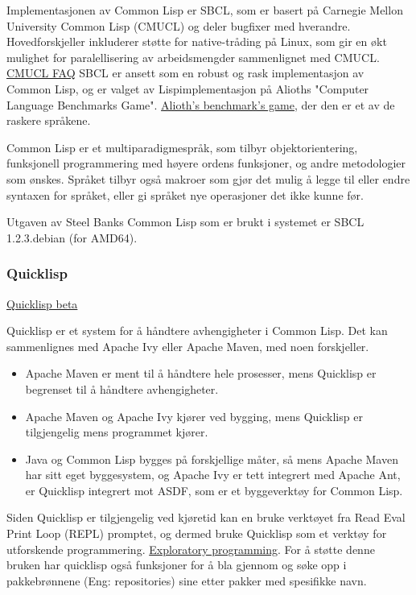 \documentclass[norsk, 11pt, a4paper]{article}
\begin{document}
Implementasjonen av Common Lisp er SBCL, som er basert på Carnegie Mellon University Common Lisp (CMUCL) og deler bugfixer med hverandre.
Hovedforskjeller inkluderer støtte for native-tråding på Linux, som gir en økt mulighet for paralellisering av arbeidsmengder sammenlignet med CMUCL. \href{http://www.cons.org/cmucl/FAQ.html}{CMUCL FAQ}
SBCL er ansett som en robust og rask implementasjon av Common Lisp, og er valget av Lispimplementasjon på Alioths "Computer Language Benchmarks Game". \href{http://benchmarksgame.alioth.debian.org/}{Alioth's benchmark's game}, der den er et av de raskere språkene.



Common Lisp er et multiparadigmespråk, som tilbyr objektorientering, funksjonell programmering med høyere ordens funksjoner, og andre metodologier som ønskes. Språket tilbyr også makroer som gjør det mulig å legge til eller endre syntaxen for språket, eller gi språket nye operasjoner det ikke kunne før. 



Utgaven av Steel Banks Common Lisp som er brukt i systemet er SBCL 1.2.3.debian (for AMD64).



\subsubsection{Quicklisp}
\href{https://www.quicklisp.org/beta/}{Quicklisp beta}



Quicklisp er et system for å håndtere avhengigheter i Common Lisp. Det kan sammenlignes med Apache Ivy eller Apache Maven, med noen forskjeller.




\begin{itemize}
\item Apache Maven er ment til å håndtere hele prosesser, mens Quicklisp er begrenset til å håndtere avhengigheter.
\item Apache Maven og Apache Ivy kjører ved bygging, mens Quicklisp er tilgjengelig mens programmet kjører.
\item Java og Common Lisp bygges på forskjellige måter, så mens Apache Maven har sitt eget byggesystem, og Apache Ivy er tett integrert med Apache Ant, er Quicklisp integrert mot ASDF, som er et byggeverktøy for Common Lisp.
\end{itemize}




Siden Quicklisp er tilgjengelig ved kjøretid kan en bruke verktøyet fra Read Eval Print Loop (REPL) promptet, og dermed bruke Quicklisp som et verktøy for utforskende programmering. \href{http://en.wikipedia.org/wiki/Exploratory(UNDERLINE programming}{Exploratory programming}. For å støtte denne bruken har quicklisp også funksjoner for å bla gjennom og søke opp i pakkebrønnene (Eng: repositories) sine etter pakker med spesifikke navn. 
\end{document}
